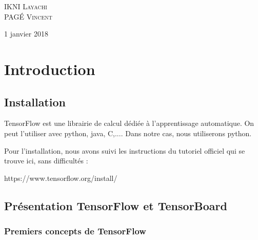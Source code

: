 \documentclass[a4paper,11pt]{book}
\begin{document}
\begin{titlepage}
\begin{sffamily}
\begin{center}
	
    \begin{minipage}{0.8\textwidth}
      \begin{flushleft} \large
        IKNI \textsc{Layachi}\\
        PAG\'E \textsc{Vincent}\\
      \end{flushleft}
    \end{minipage}
    \vfill    
    {\large 1\ier{} janvier 2018}
  \end{center}
  \end{sffamily}
\end{titlepage}
\ClearShipoutPicture



\newpage
\tableofcontents

\mainmatter
\chapter{Introduction }


\section{Installation}
TensorFlow est une librairie de calcul dédiée à l'apprentissage automatique. On peut l'utiliser avec python, java, C,.... Dans notre cas, nous utiliserons python.


Pour l'installation, nous avons suivi les instructions du tutoriel officiel qui se trouve ici, sans difficultés :

https://www.tensorflow.org/install/


\section{Présentation TensorFlow et TensorBoard}

\subsection{Premiers concepts de TensorFlow}
\end{document}
